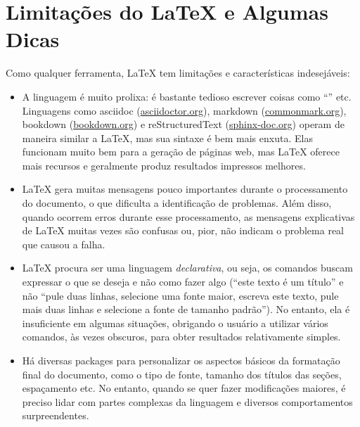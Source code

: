 \section{Limitações do \LaTeX{} e Algumas Dicas}
\label{sec:limitations}

Como qualquer ferramenta, \LaTeX{} tem limitações e características
indesejáveis:

\begin{itemize}
    \item A linguagem é muito prolixa: é bastante tedioso escrever
    coisas como ``'' etc.
    Linguagens como asciidoc (\url{asciidoctor.org}), markdown
    (\url{commonmark.org}), bookdown (\url{bookdown.org}) e
    reStructuredText (\url{sphinx-doc.org}) operam de maneira similar
    a \LaTeX{}, mas sua sintaxe é bem mais enxuta. Elas funcionam
    muito bem para a geração de páginas web, mas \LaTeX{} oferece
    mais recursos e geralmente produz resultados impressos melhores.

    \item \LaTeX{} gera muitas mensagens pouco importantes durante
    o processamento do documento, o que dificulta a identificação
    de problemas. Além disso, quando ocorrem erros durante esse
    processamento, as mensagens explicativas de \LaTeX{} muitas vezes
    são confusas ou, pior, não indicam o problema real que causou a falha.

    \item \LaTeX{} procura ser uma linguagem \emph{declarativa}, ou seja,
    os comandos buscam expressar o que se deseja e não como fazer algo
    (``este texto é um título'' e não ``pule duas linhas, selecione uma
    fonte maior, escreva este texto, pule mais duas linhas e selecione a
    fonte de tamanho padrão''). No entanto, ela é insuficiente em algumas
    situações, obrigando o usuário a utilizar vários comandos, às vezes
    obscuros, para obter resultados relativamente simples.

    \item Há diversas packages para personalizar os aspectos básicos
    da formatação final do documento, como o tipo de fonte, tamanho dos
    títulos das seções, espaçamento etc. No entanto, quando se quer
    fazer modificações maiores, é preciso lidar com partes complexas da
    linguagem e diversos comportamentos surpreendentes.


\end{itemize}
